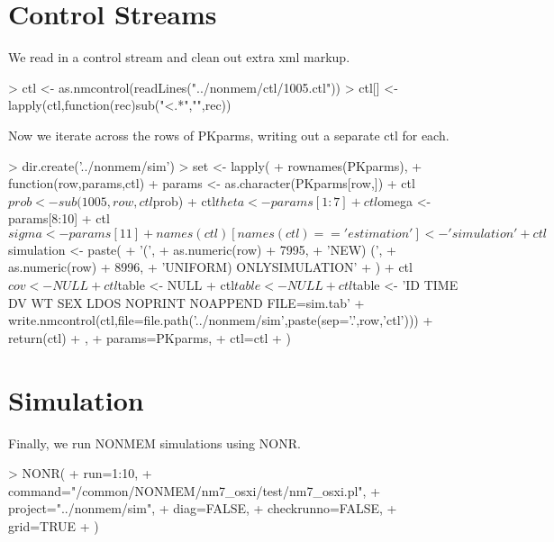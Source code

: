 \section{Control Streams}
We read in a control stream and clean out extra xml markup.
\begin{Schunk}
\begin{Sinput}
> ctl <- as.nmcontrol(readLines("../nonmem/ctl/1005.ctl"))
> ctl[] <- lapply(ctl,function(rec)sub("<.*","",rec))
\end{Sinput}
\end{Schunk}
Now we iterate across the rows of PKparms, writing out a separate ctl for each.
\begin{Schunk}
\begin{Sinput}
> dir.create('../nonmem/sim')
> set <- lapply(
+ 	rownames(PKparms),
+ 	function(row,params,ctl){
+ 		params <- as.character(PKparms[row,])
+ 		ctl$prob <- sub(1005,row,ctl$prob)
+ 		ctl$theta <- params[1:7]
+ 		ctl$omega <- params[8:10]
+ 		ctl$sigma <- params[11]
+ 		names(ctl)[names(ctl)=='estimation'] <- 'simulation'
+ 		ctl$simulation <- paste(
+ 			'(',
+ 			as.numeric(row) + 7995,
+ 			'NEW) (',
+ 			as.numeric(row) + 8996,
+ 			'UNIFORM) ONLYSIMULATION'
+ 		)
+ 		ctl$cov <- NULL
+ 		ctl$table <- NULL
+ 		ctl$table <- NULL
+ 		ctl$table <- 'ID TIME DV WT SEX LDOS NOPRINT NOAPPEND FILE=sim.tab'
+ 		write.nmcontrol(ctl,file=file.path('../nonmem/sim',paste(sep='.',row,'ctl')))
+ 		return(ctl)		
+ 	},
+ 	params=PKparms,
+ 	ctl=ctl
+ )
\end{Sinput}
\end{Schunk}
\section{Simulation}
Finally, we run NONMEM simulations using NONR.
\begin{Schunk}
\begin{Sinput}
> NONR(
+ 	run=1:10,
+ 	command="/common/NONMEM/nm7_osxi/test/nm7_osxi.pl",
+ 	project="../nonmem/sim",
+ 	diag=FALSE,
+ 	checkrunno=FALSE,
+ 	grid=TRUE
+ )
\end{Sinput}
\end{Schunk}

